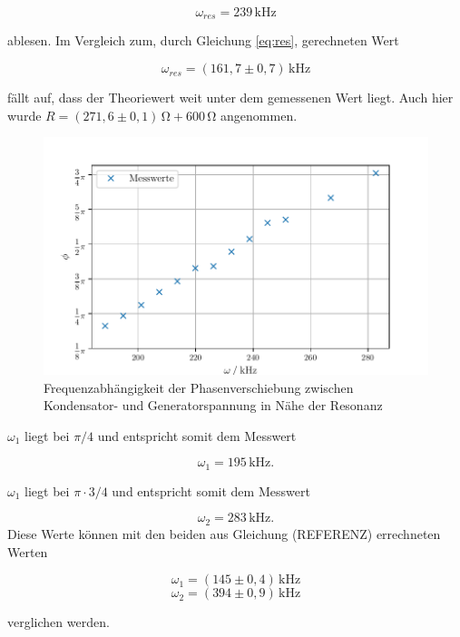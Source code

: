 \begin{equation*}
  \omega_{res}=239\,\si{\kilo\hertz}
\end{equation*}


\noindent ablesen. Im Vergleich zum, durch Gleichung \ref{eq:res},
gerechneten Wert

\begin{equation*}
  \omega_{res}=(161,7\pm0,7)\,\si{\kilo\hertz}
\end{equation*}

\noindent fällt auf, dass der Theoriewert weit unter dem gemessenen Wert liegt.
Auch hier wurde $R=(271,6\pm0,1)\,\si{\ohm} + 600\,\si{\ohm}$ angenommen.
\begin{figure}[H]
  \centering
  \includegraphics{build/plot5.pdf}
  \caption{Frequenzabhängigkeit der Phasenverschiebung zwischen Kondensator- und Generatorspannung in Nähe der Resonanz}
  \label{fig:i}
\end{figure}
\noindent $\omega_1$ liegt bei $\pi/4$ und entspricht
somit dem Messwert

\begin{equation*}
  \omega_1=195\,\si{\kilo\hertz}.
\end{equation*}


\noindent $\omega_1$ liegt bei $\pi \cdot 3/4$ und entspricht
somit dem Messwert

\begin{equation*}
\omega_2=283\,\si{\kilo\hertz}.
\end{equation*}
\noindent Diese Werte können mit den beiden aus Gleichung (REFERENZ)
errechneten Werten 

\begin{equation*}
  \omega_1=(145\pm0,4)\,\si{\kilo\hertz}
\end{equation*}
\begin{equation*}
  \omega_2=(394\pm0,9)\,\si{\kilo\hertz}
\end{equation*}

\noindent verglichen werden.


